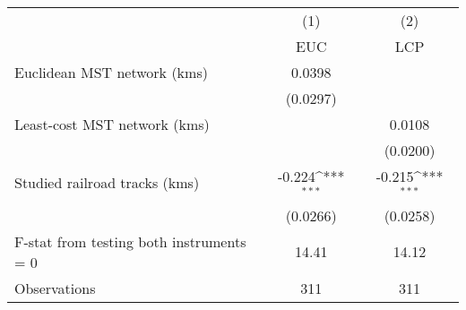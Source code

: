 {
\def\sym#1{\ifmmode^{#1}\else\(^{#1}\)\fi}
\begin{tabular}{l*{2}{c}}
\hline\hline
                &\multicolumn{1}{c}{(1)}&\multicolumn{1}{c}{(2)}\\
                &\multicolumn{1}{c}{EUC}&\multicolumn{1}{c}{LCP}\\
\hline
Euclidean MST network (kms)&   0.0398         &                  \\
                & (0.0297)         &                  \\
[1em]
Least-cost MST network (kms)&                  &   0.0108         \\
                &                  & (0.0200)         \\
[1em]
Studied railroad tracks (kms)&   -0.224\sym{***}&   -0.215\sym{***}\\
                & (0.0266)         & (0.0258)         \\
\hline
F-stat from testing both instruments = 0&    14.41         &    14.12         \\
Observations    &      311         &      311         \\
\hline\hline
\end{tabular}
}
